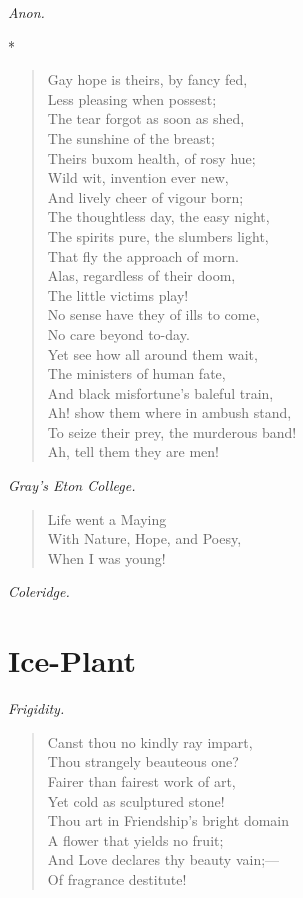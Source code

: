 \documentclass[11pt,twoside]{article}
\newcommand\flower[2]{\section*{#1}\addcontentsline{toc}{section}{#1}%
  \noindent\textit{#2.}\par\medskip}
\newcommand\stars{\begin{center}*\quad*\quad*\end{center}}
\newcommand\by[1]{\par\hfill\textit{#1}\par}
\begin{document}
\by{Anon.}

\stars

\begin{verse}
Gay hope is theirs, by fancy fed,\\
Less pleasing when possest;\\
The tear forgot as soon as shed,\\
The sunshine of the breast;\\
Theirs buxom health, of rosy hue;\\
Wild wit, invention ever new,\\
And lively cheer of vigour born;\\
The thoughtless day, the easy night,\\
The spirits pure, the slumbers light,\\
That fly the approach of morn.\\
Alas, regardless of their doom,\\
The little victims play!\\
No sense have they of ills to come,\\
No care beyond to-day.\\
Yet see how all around them wait,\\
The ministers of human fate,\\
And black misfortune’s baleful train,\\
Ah! show them where in ambush stand,\\
To seize their prey, the murderous band!\\
Ah, tell them they are men!
\end{verse}

\by{Gray’s Eton College.}

\begin{verse}
\quad Life went a Maying\\
With Nature, Hope, and Poesy,\\
\quad When I was young!
\end{verse}

\by{Coleridge.}

\flower{Ice-Plant}{Frigidity}

\begin{verse}
Canst thou no kindly ray impart,\\
\quad Thou strangely beauteous one?\\
Fairer than fairest work of art,\\
\quad Yet cold as sculptured stone!\\
Thou art in Friendship’s bright domain\\
\quad A flower that yields no fruit;\\
And Love declares thy beauty vain;---\\
\quad Of fragrance destitute!
\end{verse}
\end{document}
